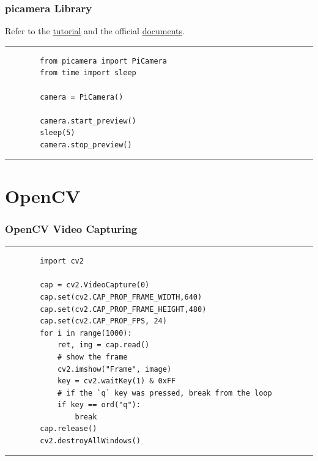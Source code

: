 \documentclass[12pt,letterpaper]{beamer}
\begin{document}
\begin{frame}[fragile]
    \frametitle{picamera Library}
    Refer to the \href{https://projects.raspberrypi.org/en/projects/getting-started-with-picamera}{tutorial} and the official \href{https://picamera.readthedocs.io/en/release-1.13/}{documents}.
    \rule{\textwidth}{1pt}   
    \scriptsize
    \begin{verbatim}
        from picamera import PiCamera
        from time import sleep

        camera = PiCamera()

        camera.start_preview()
        sleep(5)
        camera.stop_preview()
    \end{verbatim}
    \rule{\textwidth}{1pt}   
\end{frame}

\section{OpenCV}

\begin{frame}[fragile]
    \frametitle{OpenCV Video Capturing}
    \rule{\textwidth}{1pt}   
    {\scriptsize
    \begin{verbatim} 
        import cv2

        cap = cv2.VideoCapture(0)
        cap.set(cv2.CAP_PROP_FRAME_WIDTH,640)
        cap.set(cv2.CAP_PROP_FRAME_HEIGHT,480)
        cap.set(cv2.CAP_PROP_FPS, 24)
        for i in range(1000):
            ret, img = cap.read()
            # show the frame
            cv2.imshow("Frame", image)
            key = cv2.waitKey(1) & 0xFF
            # if the `q` key was pressed, break from the loop
            if key == ord("q"):
                break
        cap.release()
        cv2.destroyAllWindows()
    \end{verbatim} 
}
    \rule{\textwidth}{1pt}   
\end{frame}
\end{document}
